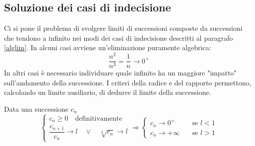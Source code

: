 \subsection{Soluzione dei casi di indecisione}
Ci si pone il problema di svolgere limiti di successioni composte da successioni che tendono a infinito nei modi dei casi di indecisione descritti al paragrafo \ref{alglim}. In alcuni casi avviene un'eliminazione puramente algebrica:
\[
	\frac{n^2}{n^3}=\frac{1}{n}\to0^+
\]
In altri casi è necessario individuare quale infinito ha un maggiore "impatto" sull'andamento della successione. I criteri della radice e del rapporto permettono, calcolando un limite ausiliario, di dedurre il limite della successione.
\begin{teor}
	\label{teor:sucradice}
	Data una successione $c_n$
	\[
		\begin{cases}
			c_n\geq0\quad\text{definitivamente} \\[1ex]
			\dfrac{c_{n+1}}{c_n}\to l\quad\lor\quad\sqrt[n]{c_n}\to l
		\end{cases}\Rightarrow
		\begin{cases}
			c_n\to0^+\quad     & \text{se }l<1 \\
			c_n\to+\infty\quad & \text{se }l>1
		\end{cases}
	\]
\end{teor}
